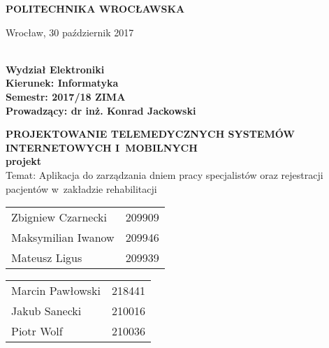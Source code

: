 \begin{titlepage}
	
	\begin{center}
		\huge{\uppercase{\textbf{Politechnika Wrocławska}}}
	\end{center}

	\begin{flushright}
		Wrocław, 30 październik 2017
	\end{flushright}

	\vspace{2cm}
	\begin{flushleft}
		\textbf{\\
			Wydział Elektroniki\\
			Kierunek: Informatyka\\
			Semestr: 2017/18 ZIMA\\
			Prowadzący: dr inż. Konrad Jackowski \\
		}
	\end{flushleft}
	
	\vspace{3cm}
	\begin{center}
		\textbf{
			\huge{\uppercase{Projektowanie telemedycznych systemów internetowych i~mobilnych}}\\
			\LARGE{projekt}
		}\\
		\huge{Temat: Aplikacja do zarządzania dniem pracy specjalistów oraz rejestracji pacjentów w~zakładzie rehabilitacji}
	\end{center}
	
	\vspace{5cm}
	\begin{multicols}{2}
		\begin{tabularx}{\textwidth}{ll}
			Zbigniew Czarnecki & 209909 \\
			Maksymilian Iwanow & 209946 \\
			Mateusz Ligus & 209939 \\
		\end{tabularx}
		\columnbreak
		\begin{tabularx}{\textwidth}{ll}
			Marcin Pawłowski & 218441 \\
			Jakub Sanecki & 210016 \\		
			Piotr Wolf & 210036 \\
		\end{tabularx}
	\end{multicols}

\end{titlepage}
